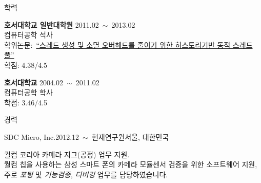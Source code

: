 \documentclass{resume} %
\begin{document}

\begin{rSection}{학력}

{\bf 호서대학교 일반대학원} \hfill 2011.02~$\sim$~2013.02 \\
컴퓨터공학 석사 \\
학위논문:~\href{http://dlibrary.hoseo.ac.kr/search/searchDetail.do?rec_key=SH1_000000950591}
{\small ``스레드 생성 및 소멸 오버헤드를 줄이기 위한 히스토리기반 동적 스레드 풀''} \\
학점: 4.38/4.5

{\bf 호서대학교} \hfill 2004.02~$\sim$~2011.02 \\
컴퓨터공학 학사 \\
학점: 3.46/4.5

\end{rSection}


\begin{rSection}{경력}



  \begin{rSubsection}{SDC Micro, Inc.}{2012.12~$\sim$~현재}{연구원}{서울, 대한민국}
  \item 퀄컴 코리아 카메라 지그(공정) 업무 지원. \\
    \small{
      퀄컴 칩을 사용하는 삼성 스마트 폰의 카메라 모듈센서 검증을 위한 소프트웨어 지원, \\
      주로 \textit{포팅} 및 \textit{기능검증}, \textit{디버깅} 업무를 담당하였습니다. }
  \end{rSubsection}

\end{rSection}

\end{document}
